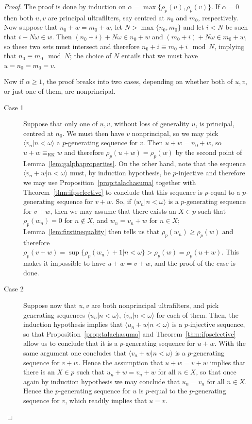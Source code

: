 \documentclass[10pt]{amsart}
\newcommand{\eqrk}[2]{#1\equiv_{\mathrm{RK}}#2}
\theoremstyle{definition}
\theoremstyle{remark}
\begin{document}
\begin{proof}
    The proof is done by induction on $\alpha=\max\{\rho_p(u),\rho_p(v)\}$. If $\alpha=0$ then both $u,v$ are principal ultrafilters, say centred at $n_0$ and $m_0$, respectively. Now suppose that $n_0+w=m_0+w$, let $N>\max\{n_0,m_0\}$ and let $i<N$ be such that $i+N\omega\in w$. Then $(n_0+i)+N\omega\in n_0+w$ and $(m_0+i)+N\omega\in m_0+w$, so these two sets must intersect and therefore $n_0+i\equiv m_0+i\mod N$, implying that $n_0\equiv m_0\mod N$; the choice of $N$ entails that we must have $u=n_0=m_0=v$.
    
    Now if $\alpha\geq 1$, the proof breaks into two cases, depending on whether both of $u,v$, or just one of them, are nonprincipal.
    
    \begin{description}
    \item[Case 1] Suppose that only one of $u,v$, without loss of generality $u$, is principal, centred at $n_0$. We must then have $v$ nonprincipal, so we may pick $\langle v_n\big|n<\omega\rangle$ a $p$-generating sequence for $v$. Then $u+w=n_0+w$, so $\eqrk{u+w}{w}$ and therefore $\rho_p(u+w)=\rho_p(w)$ by the second point of Lemma~\ref{lem:galphaproperties}. On the other hand, note that the sequence $\langle v_n+w\big|n<\omega\rangle$ must, by induction hypothesis, be $p$-injective and therefore we may use Proposition~\ref{prop:talachasuma} together with Theorem~\ref{thm:ifpselective} to conclude that this sequence is $p$-equal to a $p$-generating sequence for $v+w$. So, if $\langle w_n\big|n<\omega\rangle$ is a $p$-generating sequence for $v+w$, then we may assume that there exists an $X\in p$ such that $\rho_p(w_n)=0$ for $n\notin X$, and $w_n=v_n+w$ for $n\in X$; Lemma~\ref{lem:firstinequality} then tells us that $\rho_p(w_n)\geq\rho_p(w)$ and therefore $\rho_p(v+w)=\sup\{\rho_p(w_n)+1\big|n<\omega\}>\rho_p(w)=\rho_p(u+w)$. This makes it impossible to have $u+w=v+w$, and the proof of the case is done.
    \item[Case 2] Suppose now that $u,v$ are both nonprincipal ultrafilters, and pick generating sequences $\langle u_n\big|n<\omega\rangle$, $\langle v_n\big|n<\omega\rangle$ for each of them. Then, the induction hypothesis implies that $\langle u_n+w\big|n<\omega\rangle$ is a $p$-injective sequence, so that Proposition~\ref{prop:talachasuma} and Theorem~\ref{thm:ifpselective} allow us to conclude that it is a $p$-generating sequence for $u+w$. With the same argument one concludes that $\langle v_n+w\big|n<\omega\rangle$ is a $p$-generating sequence for $v+w$. Hence the assumption that $u+w=v+w$ implies that there is an $X\in p$ such that $u_n+w=v_n+w$ for all $n\in X$, so that once again by induction hypothesis we may conclude that $u_n=v_n$ for all $n\in X$. Hence the $p$-generating sequence for $u$ is $p$-equal to the $p$-generating sequence for $v$, which readily implies that $u=v$.
    \end{description}
\end{proof}
\end{document}
